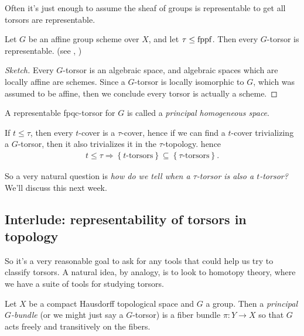 \documentclass[11pt]{amsart}
\begin{document}
Often it's just enough to assume the sheaf of groups is representable to get all torsors are representable.

\begin{proposition}\label{prop:affine-gp-torsors-representable} 
Let $G$ be an affine group scheme over $X$, and let $\tau\le \mathrm{fppf}$. Then every $G$-torsor is representable. (see \cite[0497]{Stacks}, \cite[3.25]{Youcis})
\end{proposition}
\begin{proof}[Sketch] Every $G$-torsor is an algebraic space, and algebraic spaces which are locally affine are schemes. Since a $G$-torsor is locally isomorphic to $G$, which was assumed to be affine, then we conclude every torsor is actually a scheme.
\end{proof}


\begin{terminology} A representable fpqc-torsor for $G$ is called a \textit{principal homogeneous space}.
\end{terminology}


\begin{remark} If $t \le \tau$, then every $t$-cover is a $\tau$-cover, hence if we can find a $t$-cover trivializing a $G$-torsor, then it also trivializes it in the $\tau$-topology. hence
\begin{align*}
    t\le \tau \Rightarrow \left\{ t\text{-torsors} \right\} \subseteq \left\{ \tau \text{-torsors} \right\}.
\end{align*}
\end{remark}
So a very natural question is \textit{how do we tell when a $\tau$-torsor is also a $t$-torsor?} We'll discuss this next week.


\subsection{Interlude: representability of torsors in topology}

So it's a very reasonable goal to ask for any tools that could help us try to classify torsors. A natural idea, by analogy, is to look to homotopy theory, where we have a suite of tools for studying torsors.

\begin{definition} Let $X$ be a compact Hausdorff topological space and $G$ a group. Then a \textit{principal $G$-bundle} (or we might just say a $G$-torsor) is a fiber bundle $\pi \colon Y \to X$ so that $G$ acts freely and transitively on the fibers.
\end{definition}
\end{document}
